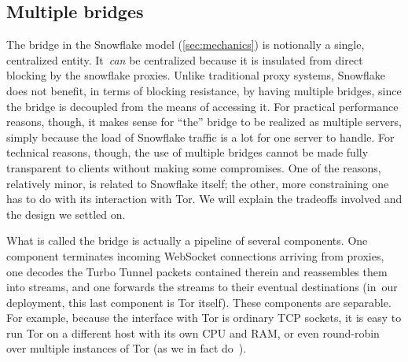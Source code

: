 \documentclass[letterpaper,twocolumn]{article}
\begin{document}
\subsection{Multiple bridges}
\label{sec:multi-bridge}


The bridge in the Snowflake model (\autoref{sec:mechanics})
is notionally a single, centralized entity.
It~\emph{can} be centralized
because it is insulated from direct blocking
by the snowflake proxies.
Unlike traditional proxy systems,
Snowflake does not benefit, in terms of blocking resistance,
by having multiple bridges,
since the bridge is decoupled from the means of accessing it.
For practical performance reasons, though,
it makes sense for ``the'' bridge to be realized as
multiple servers, simply because the load of Snowflake traffic
is a lot for one server to handle.
For technical reasons, though,
the use of multiple bridges cannot be made fully transparent to clients
without making some compromises.
One of the reasons, relatively minor, is related to Snowflake itself;
the other, more constraining one has to do with its interaction with Tor.
We will explain the tradeoffs involved
and the design we settled on.

What is called the bridge is actually a pipeline of several components.
One component terminates incoming WebSocket connections arriving from proxies,
one decodes the Turbo Tunnel packets contained therein and reassembles them into streams,
and one forwards the streams to their eventual destinations
(in~our deployment, this last component is Tor itself).
These components are separable.
For example, because the interface with Tor is ordinary TCP sockets,
it is easy to run Tor on a different host with its own CPU and RAM,
or even round-robin over multiple instances of Tor
(as we in fact do~\cite{Fifield2023a}).
\end{document}
